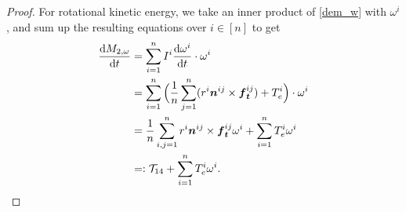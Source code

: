 \documentclass[a4paper,11pt]{article}
\numberwithin{equation}{section}
\theoremstyle{definition}
\newcommand{\bfv}{\boldsymbol{v}}
\newcommand{\bfn}{\boldsymbol{n}}
\newcommand{\bft}{\boldsymbol{t}}
\newcommand{\bff}{\boldsymbol{f}}
\def\d{{  \rm d}}
\newcommand{\T}{\mathcal{T}}
\begin{document}
\begin{proof}
%
%

For rotational kinetic energy, we take an inner product of \eqref{dem_w} with $\omega^i$, and sum up the resulting equations over $i \in [n]$ to get 
\begin{align}
\begin{aligned} \label{eq:dtM2w}
    \frac{\d M_{2,\omega}}{\d t} & = \sum_{i=1}^n I^i\frac{\d\omega^i}{\d t} \cdot \omega^i \\
    & =  \sum_{i=1}^n \Big( \frac{1}{n} \sum_{j=1}^{n} ( r^i\bfn^{ij}\times \bff_{\bft}^{ij}) + T^i_e \Big) \cdot \omega^i   \\
    & = \frac{1}{n}  \sum_{i, j=1}^n  r^i\bfn^{ij}\times \bff_{\bft}^{ij} \omega^i + \sum_{i=1}^{n} T^i_e \omega^i    \\
    & =:  \T_{14} + \sum_{i=1}^{n} T^i_e \omega^i.
\end{aligned}
\end{align}


\end{proof}
\end{document}
